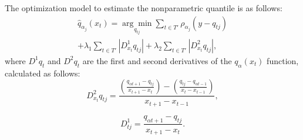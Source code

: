 The optimization model to estimate the nonparametric quantile is as follows:
\begin{equation}
\begin{split}
\hat{q}_{\alpha_j}(x_t) =\underset{q_{tj}}{\arg\min}\sum_{t\in T'} \rho_{\alpha_j} \left( y - q_{tj} \right) \\ +\lambda_1  \sum_{t\in T'}|D_{x_t}^{1}q_{tj}| +\lambda_2  \sum_{t\in T'}|D_{x_t}^{2}q_{tj}|,
\end{split}
\end{equation}
where $D^1 q_t$ and $D^2 q_t$ are the first and second derivatives of the $q_\alpha(x_t)$ function, calculated as follows:
\begin{equation*}
D_{x_{t}}^{2}q_{tj}=\frac{\left(\frac{q_{\alpha t+1}-q_{tj}}{x_{t+1}-x_{t}}\right)-\left(\frac{q_{tj}-q_{\alpha t-1}}{x_{t}-x_{t-1}}\right)}{x_{t+1}- x_{t-1}},
\end{equation*}

\begin{equation*}
D^{1}_{tj}=\frac{q_{\alpha t+1}-q_{tj}}{x_{t+1}-x_{t}}.
\end{equation*}

